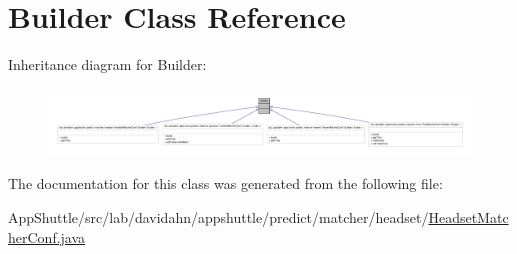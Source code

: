 \hypertarget{class_base_matcher_conf_1_1_builder}{\section{\-Builder \-Class \-Reference}
\label{class_base_matcher_conf_1_1_builder}
}


\-Inheritance diagram for \-Builder\-:
\nopagebreak
\begin{figure}[H]
\begin{center}
\leavevmode
\includegraphics[width=350pt]{class_base_matcher_conf_1_1_builder__inherit__graph}
\end{center}
\end{figure}


\-The documentation for this class was generated from the following file\-:\begin{DoxyCompactItemize}
\item 
\-App\-Shuttle/src/lab/davidahn/appshuttle/predict/matcher/headset/\hyperlink{_headset_matcher_conf_8java}{\-Headset\-Matcher\-Conf.\-java}\end{DoxyCompactItemize}
